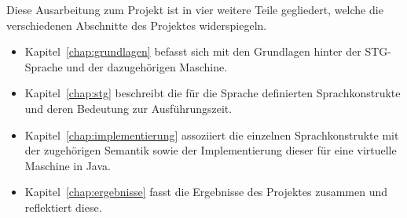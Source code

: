 Diese Ausarbeitung zum Projekt ist in vier weitere Teile gegliedert, welche die verschiedenen Abschnitte des Projektes widerspiegeln.

\begin{itemize}
\item Kapitel~\ref{chap:grundlagen} befasst sich mit den Grundlagen hinter der STG-Sprache und der dazugehörigen Maschine.

\item Kapitel~\ref{chap:stg} beschreibt die für die Sprache definierten Sprachkonstrukte und deren Bedeutung zur Ausführungszeit.

\item Kapitel~\ref{chap:implementierung} assoziiert die einzelnen Sprachkonstrukte mit der zugehörigen Semantik sowie der Implementierung dieser für eine virtuelle Maschine in Java.

\item Kapitel~\ref{chap:ergebnisse} fasst die Ergebnisse des Projektes zusammen und reflektiert diese.
\end{itemize}


